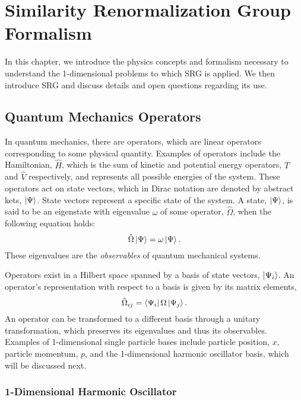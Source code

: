 \chapter{Similarity Renormalization Group Formalism}

In this chapter, we introduce the physics concepts and formalism necessary to understand the 1-dimensional problems to which SRG is applied. We then introduce SRG and discuss details and open questions regarding its use.

\section{Quantum Mechanics Operators}

In quantum mechanics, there are operators, which are linear operators corresponding to some physical quantity. Examples of operators include the Hamiltonian, $\hat{H}$, which is the sum of kinetic and potential energy operators, $\hat{T}$ and $\hat{V}$ respectively, and represents all possible energies of the system. These operators act on state vectors, which in Dirac notation are denoted by abstract kets, $\ket{\Psi}$. State vectors represent a specific state of the system. A state, $\ket{\Psi}$, is said to be an eigenstate with eigenvalue $\omega$ of some operator, $\hat{\Omega}$, when the following equation holds:
\begin{equation}
\hat{\Omega}\ket{\Psi} = \omega\ket{\Psi}.
\end{equation}
These eigenvalues are the \textit{observables} of quantum mechanical systems.

Operators exist in a Hilbert space spanned by a basis of state vectors, $\ket{\Psi_i}$. An operator's representation with respect to a basis is given by its matrix elements,
\begin{equation}
\hat{\Omega}_{ij} = \bra{\Psi_i}\Omega\ket{\Psi_j}.
\end{equation}
An operator can be transformed to a different basis through a unitary transformation, which preserves its eigenvalues and thus its observables. Examples of 1-dimensional single particle bases include particle position, $x$, particle momentum, $p$, and the 1-dimensional harmonic oscillator basis, which will be discussed next.

\subsection{1-Dimensional Harmonic Oscillator}

